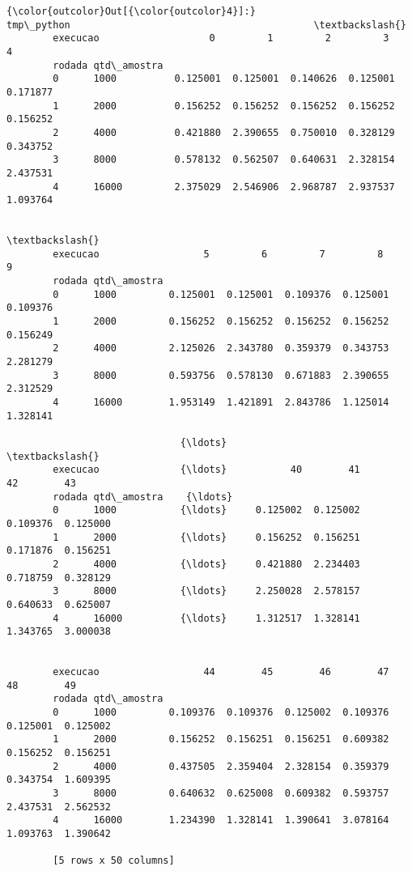 \documentclass[11pt]{article}
\begin{document}
\begin{Verbatim}[commandchars=\\\{\}]
{\color{outcolor}Out[{\color{outcolor}4}]:}                    tmp\_python                                          \textbackslash{}
        execucao                   0         1         2         3         4    
        rodada qtd\_amostra                                                      
        0      1000          0.125001  0.125001  0.140626  0.125001  0.171877   
        1      2000          0.156252  0.156252  0.156252  0.156252  0.156252   
        2      4000          0.421880  2.390655  0.750010  0.328129  0.343752   
        3      8000          0.578132  0.562507  0.640631  2.328154  2.437531   
        4      16000         2.375029  2.546906  2.968787  2.937537  1.093764   
        
                                                                              \textbackslash{}
        execucao                  5         6         7         8         9    
        rodada qtd\_amostra                                                     
        0      1000         0.125001  0.125001  0.109376  0.125001  0.109376   
        1      2000         0.156252  0.156252  0.156252  0.156252  0.156249   
        2      4000         2.125026  2.343780  0.359379  0.343753  2.281279   
        3      8000         0.593756  0.578130  0.671883  2.390655  2.312529   
        4      16000        1.953149  1.421891  2.843786  1.125014  1.328141   
        
                              {\ldots}                                             \textbackslash{}
        execucao              {\ldots}           40        41        42        43   
        rodada qtd\_amostra    {\ldots}                                              
        0      1000           {\ldots}     0.125002  0.125002  0.109376  0.125000   
        1      2000           {\ldots}     0.156252  0.156251  0.171876  0.156251   
        2      4000           {\ldots}     0.421880  2.234403  0.718759  0.328129   
        3      8000           {\ldots}     2.250028  2.578157  0.640633  0.625007   
        4      16000          {\ldots}     1.312517  1.328141  1.343765  3.000038   
        
                                                                                        
        execucao                  44        45        46        47        48        49  
        rodada qtd\_amostra                                                              
        0      1000         0.109376  0.109376  0.125002  0.109376  0.125001  0.125002  
        1      2000         0.156252  0.156251  0.156251  0.609382  0.156252  0.156251  
        2      4000         0.437505  2.359404  2.328154  0.359379  0.343754  1.609395  
        3      8000         0.640632  0.625008  0.609382  0.593757  2.437531  2.562532  
        4      16000        1.234390  1.328141  1.390641  3.078164  1.093763  1.390642  
        
        [5 rows x 50 columns]
\end{Verbatim}
            
\end{document}

